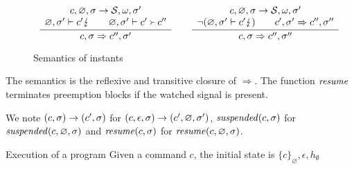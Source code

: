 \begin{figure}
{{$$\begin{array}{c}
  \cfrac{
    \begin{array}{c}
    c,\varnothing,\sigma \rightarrow \mathcal{S},\omega,\sigma' \\
    \varnothing,\sigma' \vdash c' \lightning \qquad{}
    \varnothing, \sigma' \vdash c' \Yright c''
    \end{array}
  }{
    c,\sigma \Rightarrow c'', \sigma'
  }
  \qquad
  \cfrac{
    \begin{array}{c}
    c,\varnothing,\sigma \rightarrow \mathcal{S},\omega,\sigma'\\
    \neg (\varnothing,\sigma' \vdash c' \lightning) \qquad
    c', \sigma' \Rightarrow c'',\sigma''
    \end{array}
  }{
    c,\sigma \Rightarrow c'',\sigma''
  }
  \end{array}
$$
}}
\caption{Semantics of instants}
\label{sem-commands-instants-fig}
\end{figure}
The semantics is the reflexive and transitive closure of $\Rightarrow$.
The function ${\mathit{resume}}$ terminates preemption blocks if the watched signal is present.

We note $(c,\sigma) \rightarrow (c', \sigma)$ for $(c,\epsilon,\sigma) \rightarrow (c',\varnothing,\sigma')$,
${\mathit{suspended}}(c,\sigma)$ for ${\mathit{suspended}}(c,\varnothing,\sigma)$ and
${\mathit{resume}}(c,\sigma)$ for ${\mathit{resume}}(c,\varnothing,\sigma)$.

\begin{paragraph}{Execution of a program}
  Given a command $c$, the initial state is $\{c\}_\varnothing,\epsilon,h_\emptyset$
\end{paragraph}